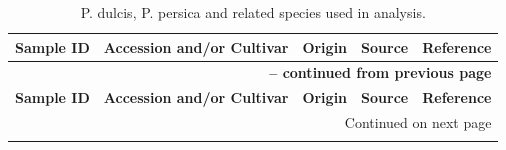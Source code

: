 \documentclass[12pt]{article}
\begin{document}
\begin{center}
\begin{longtable}{lllll}
\caption[P. dulcis, P. persica and related species used in analysis.]{P. dulcis, P. persica and related species used in analysis.} \label{my-label} \\
\hline \hline \multicolumn{1}{l}{\textbf{Sample ID}} &
\multicolumn{1}{l}{\textbf{Accession and/or Cultivar}} &
\multicolumn{1}{l}{\textbf{Origin}} &
\multicolumn{1}{l}{\textbf{Source}}  &
\multicolumn{1}{c}{\textbf{Reference}} \\ \hline 
\endfirsthead

\multicolumn{5}{r}{{\bfseries \tablename\ \thetable{} -- continued from previous page}} \\
\hline \multicolumn{1}{l}{\textbf{Sample ID}} &
\multicolumn{1}{l}{\textbf{Accession and/or Cultivar}} &
\multicolumn{1}{l}{\textbf{Origin}} &
\multicolumn{1}{l}{\textbf{Source}} &
\multicolumn{1}{c}{\textbf{Reference}} \\ \hline 
\endhead

\hline \multicolumn{5}{r}{{Continued on next page}} \\ \hline
\endfoot

\hline \hline
\endlastfoot


\end{longtable}
\end{center}
\end{document}
